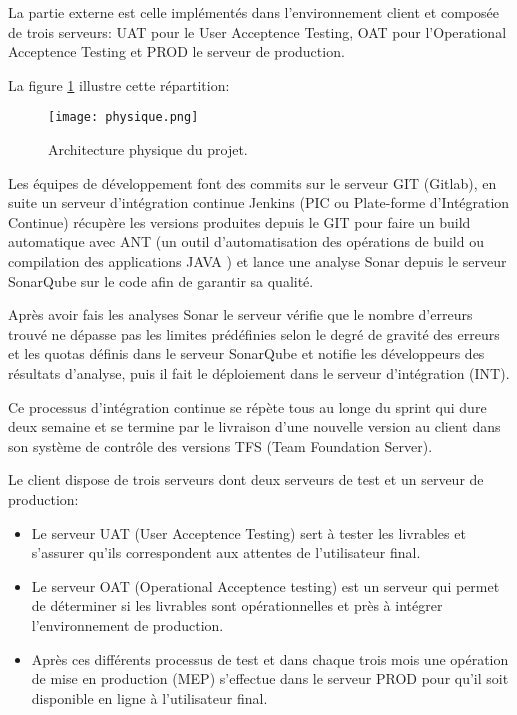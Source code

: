 \medskip

La partie externe est celle implémentés dans l'environnement client et composée de trois serveurs: UAT pour le User Acceptence Testing, OAT pour l'Operational Acceptence Testing et PROD le serveur de production.
\medskip

La figure \ref{fig:architecture2} illustre cette répartition:

\begin{figure}[ht]
  \centering
  \texttt{[image: physique.png]}
  \caption{Architecture physique du projet.}
  \label{fig:architecture2}
\end{figure}

Les équipes de développement font des commits sur le serveur GIT (Gitlab), en suite un serveur d’intégration continue Jenkins (PIC ou Plate-forme d'Intégration Continue) récupère les versions produites depuis le GIT pour faire un build automatique avec ANT (un outil d'automatisation des opérations de build ou compilation des applications JAVA \cite{wiki:ant}) et lance une analyse Sonar depuis le serveur SonarQube sur le code afin de garantir sa qualité.
\medskip

Après avoir fais les analyses Sonar le serveur vérifie que le nombre d'erreurs trouvé ne dépasse pas les limites prédéfinies selon le degré de gravité des erreurs et les quotas définis dans le serveur SonarQube et notifie les développeurs des résultats d'analyse, puis il fait le déploiement dans le serveur d’intégration (INT).
\medskip

Ce processus d'intégration continue se répète tous au longe du sprint qui dure deux semaine et se termine par le livraison d'une nouvelle version au client dans son système de contrôle des versions TFS (Team Foundation Server).
\medskip

Le client dispose de trois serveurs dont deux serveurs de test et un serveur de production:
\medskip

\begin{itemize}
    \item Le serveur UAT (User Acceptence Testing) sert à tester les livrables et s'assurer qu'ils correspondent aux attentes de l'utilisateur final.
\smallskip
\item Le serveur OAT (Operational Acceptence testing) est un serveur qui permet de déterminer si les livrables sont opérationnelles et près à intégrer l'environnement de production.
\smallskip
\item Après ces différents processus de test et dans chaque trois mois  une opération de mise en production (MEP) s'effectue  dans le serveur PROD pour qu'il soit disponible en ligne à l'utilisateur final.
\end{itemize}


